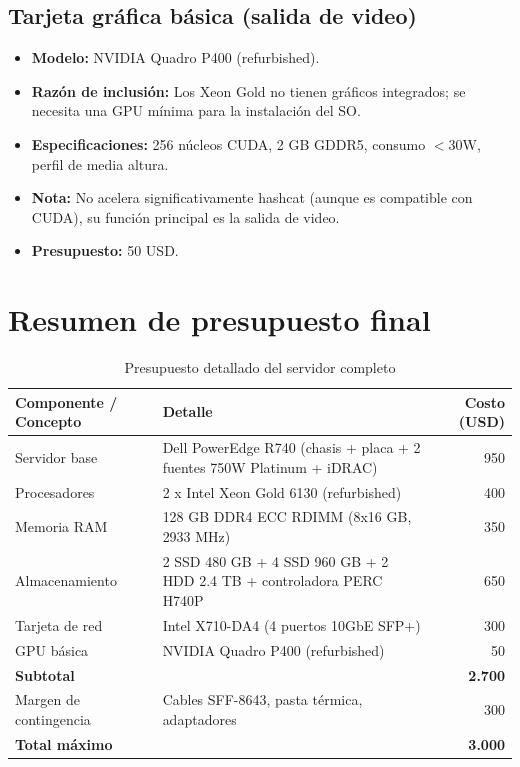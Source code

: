 \documentclass[12pt, letterpaper]{article}
\begin{document}
\subsection{Tarjeta gráfica básica (salida de video)}

\begin{itemize}
    \item \textbf{Modelo:} NVIDIA Quadro P400 (refurbished).
    \item \textbf{Razón de inclusión:} Los Xeon Gold no tienen gráficos integrados; se necesita una GPU mínima para la instalación del SO.
    \item \textbf{Especificaciones:} 256 núcleos CUDA, 2 GB GDDR5, consumo $<$30W, perfil de media altura.
    \item \textbf{Nota:} No acelera significativamente hashcat (aunque es compatible con CUDA), su función principal es la salida de video.
    \item \textbf{Presupuesto:} 50 USD.
\end{itemize}

\section{Resumen de presupuesto final}

\begin{table}[!ht]
    \centering
    \caption{Presupuesto detallado del servidor completo}
    \label{tab:budget}
    \begin{tabular}{p{5cm}p{6cm}r}
        \toprule
        \textbf{Componente / Concepto} & \textbf{Detalle} & \textbf{Costo (USD)} \\
        \midrule
        Servidor base & Dell PowerEdge R740 (chasis + placa + 2 fuentes 750W Platinum + iDRAC) & 950 \\
        Procesadores & 2 x Intel Xeon Gold 6130 (refurbished) & 400 \\
        Memoria RAM & 128 GB DDR4 ECC RDIMM (8x16 GB, 2933 MHz) & 350 \\
        Almacenamiento & 2 SSD 480 GB + 4 SSD 960 GB + 2 HDD 2.4 TB + controladora PERC H740P & 650 \\
        Tarjeta de red & Intel X710-DA4 (4 puertos 10GbE SFP+) & 300 \\
        GPU básica & NVIDIA Quadro P400 (refurbished) & 50 \\
        \midrule
        \textbf{Subtotal} & & \textbf{2.700} \\
        Margen de contingencia & Cables SFF-8643, pasta térmica, adaptadores & 300 \\
        \midrule
        \textbf{Total máximo} & & \textbf{3.000} \\
        \bottomrule
    \end{tabular}
\end{table}
\end{document}
